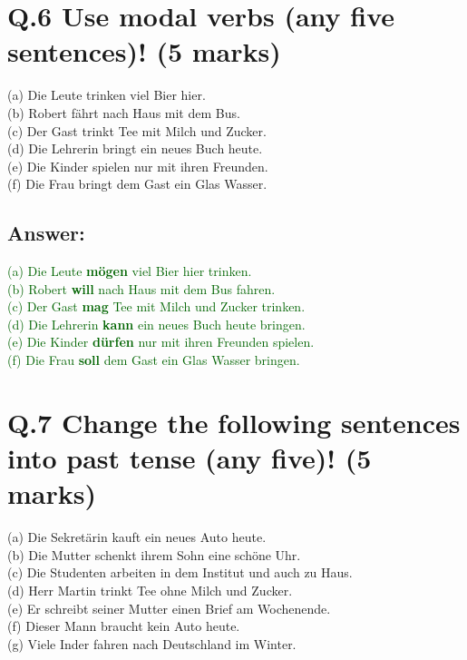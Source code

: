 \documentclass[a4paper,12pt]{article}
\begin{document}
\vspace{1cm}

\section*{Q.6 Use modal verbs (any five sentences)! (5 marks)}

(a) Die Leute trinken viel Bier hier.\\
(b) Robert fährt nach Haus mit dem Bus.\\
(c) Der Gast trinkt Tee mit Milch und Zucker.\\
(d) Die Lehrerin bringt ein neues Buch heute.\\
(e) Die Kinder spielen nur mit ihren Freunden.\\
(f) Die Frau bringt dem Gast ein Glas Wasser.

\subsection*{Answer:}
\textcolor{darkgreen}{(a) Die Leute \textbf{mögen} viel Bier hier trinken.\\}
\textcolor{darkgreen}{(b) Robert \textbf{will} nach Haus mit dem Bus fahren.\\}
\textcolor{darkgreen}{(c) Der Gast \textbf{mag} Tee mit Milch und Zucker trinken.\\}
\textcolor{darkgreen}{(d) Die Lehrerin \textbf{kann} ein neues Buch heute bringen.\\}
\textcolor{darkgreen}{(e) Die Kinder \textbf{dürfen} nur mit ihren Freunden spielen.\\}
\textcolor{darkgreen}{(f) Die Frau \textbf{soll} dem Gast ein Glas Wasser bringen.\\}

\vspace{1cm}

\section*{Q.7 Change the following sentences into past tense (any five)! (5 marks)}

(a) Die Sekretärin kauft ein neues Auto heute.\\
(b) Die Mutter schenkt ihrem Sohn eine schöne Uhr.\\
(c) Die Studenten arbeiten in dem Institut und auch zu Haus.\\
(d) Herr Martin trinkt Tee ohne Milch und Zucker.\\
(e) Er schreibt seiner Mutter einen Brief am Wochenende.\\
(f) Dieser Mann braucht kein Auto heute.\\
(g) Viele Inder fahren nach Deutschland im Winter.
\end{document}
